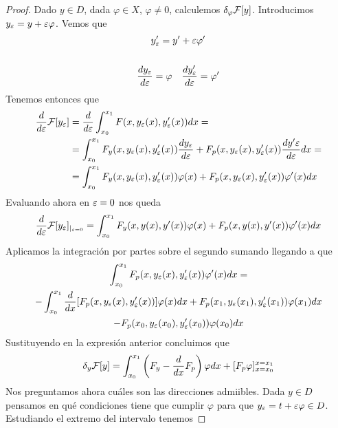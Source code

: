 \begin{teo}
    \begin{proof}
        Dado $y\in D$, dada $\varphi\in X$, $\varphi\neq 0$, calculemos $\delta_\varphi \mathcal{F}[y]$. Introducimos $y_\varepsilon = y + \varepsilon \varphi$. Vemos que 
        \begin{gather*}
            y'_\veps = y' + \veps \varphi'\\\\
            \frac{dy_\veps}{d\veps} = \varphi \ \ \ \frac{dy'_\veps}{d\veps} = \varphi'
        \end{gather*}
        Tenemos entonces que 
        \begin{align*}
            \frac{d}{d\varepsilon}\mathcal{F}[y_\varepsilon] &= \frac{d}{d\varepsilon} \int_{x_0}^{x_1} F(x, y_\varepsilon(x), y_\varepsilon'(x)) dx =\\
            &= \int_{x_0}^{x_1} F_y(x, y_\varepsilon(x), y_\varepsilon'(x))\frac{dy_\varepsilon}{d\varepsilon} + F_p(x, y_\varepsilon(x), y_\varepsilon'(x))\frac{dy'\varepsilon}{d\varepsilon} dx =\\
            &= \int_{x_0}^{x_1} F_y(x, y_\varepsilon(x), y_\varepsilon'(x)) \varphi(x) + F_p(x, y_\varepsilon(x), y_\varepsilon'(x))\varphi'(x) dx
        \end{align*}
        Evaluando ahora en $\varepsilon=0$ nos queda
        \begin{align*}
            \frac{d}{d\varepsilon} \mathcal{F}[y_\varepsilon]_{|_{\varepsilon = 0}} = \int_{x_0}^{x_1} F_y(x, y(x), y'(x)) \varphi(x) + F_p(x, y(x), y'(x))\varphi'(x) dx
        \end{align*}
        Aplicamos la integración por partes sobre el segundo sumando llegando a que 
        \begin{gather*}
            \int_{x_0}^{x_1} F_p(x, y_\varepsilon(x), y_\varepsilon'(x))\varphi'(x) dx =\\ - \int_{x_0}^{x_1} \frac{d}{dx}[F_p(x, y_\varepsilon(x), y_\varepsilon'(x))] \varphi(x) dx + F_p(x_1, y_\varepsilon(x_1), y_\varepsilon'(x_1))\varphi(x_1) dx \\
            - F_p(x_0, y_\varepsilon(x_0), y_\varepsilon'(x_0))\varphi(x_0) dx
        \end{gather*}
        Sustituyendo en la expresión anterior concluimos que
        \begin{gather*}
            \delta_y \mathcal{F}[y] = \int_{x_0}^{x_1} \left(F_y - \frac{d}{dx} F_p\right)\varphi dx + [F_p \varphi]_{x=x_0}^{x= x_1}
        \end{gather*}
        Nos preguntamos ahora cuáles son las direcciones admiibles. Dada $y\in D$ pensamos en qué condiciones tiene que cumplir $\varphi$ para que $y_\varepsilon = t+\varepsilon\varphi \in D$. Estudiando el extremo del intervalo tenemos

\end{proof}
\end{teo}
